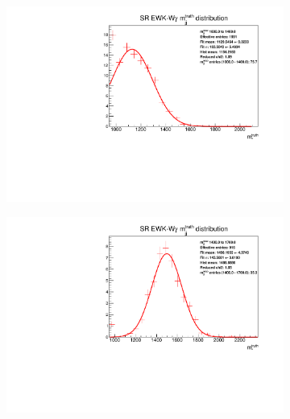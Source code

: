 \begin{figure}[t]
\centering
\begin{subfigure}[b]{0.48\textwidth}
    \centering
    \includegraphics[width=\textwidth]{plots/diffx/binning/Gaussians/jj_m_bin1_SR.pdf}
    \caption{}
\end{subfigure}
\hfill
\begin{subfigure}[b]{0.48\textwidth}
    \centering
    \includegraphics[width=\textwidth]{plots/diffx/binning/Gaussians/jj_m_bin2_SR.pdf}
    \caption{}
\end{subfigure}
\begin{subfigure}[b]{0.48\textwidth}
    \centering

\end{subfigure}
\end{figure}
